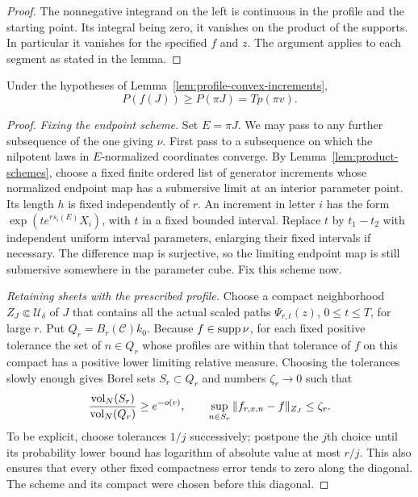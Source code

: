 \begin{proof}
The nonnegative integrand on the left is continuous in the profile
and the starting point.  Its integral being zero, it vanishes on
the product of the supports.  In particular it vanishes for the
specified $f$ and $z$.  The argument applies to each segment as
stated in the lemma.
\end{proof}

\begin{lemma}\label{lem:profile-segment-volume}
Under the hypotheses of Lemma~\ref{lem:profile-convex-increments},
\begin{equation}\label{eq:profile-segment-volume}
 P(f(J))\ge P(\pi J)=T p(\pi v).
\end{equation}
\end{lemma}

\begin{proof}
\emph{Fixing the endpoint scheme.}
Set $E=\pi J$.  We may pass to any further subsequence of the one
giving $\nu$.  First pass to a subsequence on which the nilpotent
laws in $E$-normalized coordinates converge.  By
Lemma~\ref{lem:product-schemes}, choose a fixed finite ordered list
of generator increments whose normalized endpoint map has a
submersive limit at an interior parameter point.  Its length $h$
is fixed independently of $r$.  An increment in letter $i$ has the
form $\exp(t e^{rs_i(E)}X_i)$, with $t$ in a fixed bounded interval.
Replace $t$ by $t_1-t_2$ with independent uniform interval parameters,
enlarging their fixed intervals if necessary.  The difference map
is surjective, so the limiting endpoint map is still submersive
somewhere in the parameter cube.  Fix this scheme now.

\emph{Retaining sheets with the prescribed profile.}
Choose a compact neighborhood $Z_J\Subset\mathcal U_\delta$ of $J$
that contains all the actual scaled paths $\Psi_{r,t}(z)$,
$0\le t\le T$, for large $r$.  Put $Q_r=B_r(\mathcal C)k_0$.
Because $f\in\operatorname{supp}\nu$, for
each fixed positive tolerance the set of $n\in Q_r$ whose profiles
are within that tolerance of $f$ on this compact has a positive
lower limiting relative measure.  Choosing the tolerances slowly
enough gives Borel sets $S_r\subset Q_r$ and numbers $\zeta_r\to0$
such that
\begin{equation}\label{eq:profile-good-mass}
 \frac{\operatorname{vol}_N(S_r)}{\operatorname{vol}_N(Q_r)}\ge e^{-o(r)},\qquad
 \sup_{n\in S_r}\|f_{r,x,n}-f\|_{Z_J}\le\zeta_r.
\end{equation}
To be explicit, choose tolerances $1/j$ successively; postpone the
$j$th choice until its probability lower bound has logarithm of
absolute value at most $r/j$.  This also ensures that every other
fixed compactness error tends to zero along the diagonal.  The
scheme and its compact were chosen before this diagonal.


\end{proof}
